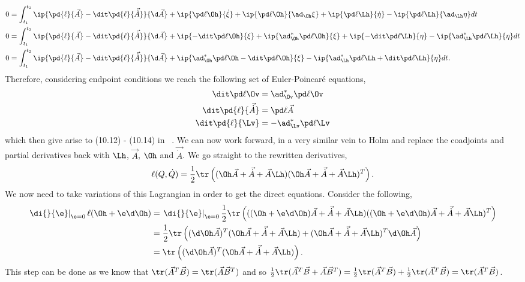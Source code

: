 \begin{align*}
  0 &= \int_{t_1}^{t_2} \ip{\pd{\ell}{\vec A} - \dit\pd{\ell}{\vec{\dot A}}}{\d \vec A} + \ip{\pd \ell \Oh}{\dot \xi} + \ip{\pd \ell \Oh}{\ad_{\Oh} \xi} + \ip{\pd \ell \Lh}{\dot \eta} - \ip{\pd \ell \Lh}{\ad_{\Lh} \eta}dt \\
  0 &= \int_{t_1}^{t_2} \ip{\pd{\ell}{\vec A} - \dit\pd{\ell}{\vec{\dot A}}}{\d \vec A} + \ip{-\dit\pd \ell \Oh}{\xi} + \ip{\ad^*_{\Oh} \pd \ell \Oh}{\xi} + \ip{-\dit \pd \ell \Lh}{\eta} - \ip{\ad^*_{\Lh} \pd \ell \Lh}{ \eta}dt \\
  0 &= \int_{t_1}^{t_2} \ip{\pd{\ell}{\vec A} - \dit\pd{\ell}{\vec{\dot A}}}{\d \vec A} + \ip{\ad^*_{\Oh} \pd \ell \Oh -\dit\pd \ell \Oh}{\xi} - \ip{\ad^*_{\Lh} \pd \ell \Lh + \dit \pd \ell \Lh}{ \eta}dt.
\end{align*}
Therefore, considering endpoint conditions we reach the following set of Euler-Poincar\'e equations,
\begin{align}
  \dit \pd \ell \Ov &= \ad^*_{\Ov} \pd \ell \Ov \\
  \dit \pd{\ell}{\vec{\dot A}} &= \pd \ell {\vec A} \\
  \dit \pd{\ell}{\Lv} &= -\ad^*_{\Lv} \pd \ell \Lv
\end{align}
which then give arise to (10.12) - (10.14) in ~\cite{holm_schmah_stoica_2009}. We can now work forward, in a very similar vein to Holm and replace the coadjoints and partial derivatives back with $\Lh$, $\vec A$, $\Oh$ and $\vec{\dot A}$. We go straight to the rewritten derivatives,
$$ \ell(Q, \dot Q) = \frac{1}{2}\tr \left( (\Oh \vec A + \vec {\dot A} + \vec A\Lh)(\Oh \vec A + \vec {\dot A} + \vec A\Lh)^T \right). $$
We now need to take variations of this Lagrangian in order to get the direct equations. Consider the following,
\begin{align*}
  \left.\di{}{\e}\right|_{\e = 0}\ell (\Oh + \e\d\Oh) &= \left.\di{}{\e}\right|_{\e = 0} \frac{1}{2}\tr\left( ((\Oh + \e\d\Oh) \vec A + \vec {\dot A} + \vec A\Lh)((\Oh + \e\d\Oh) \vec A + \vec {\dot A} + \vec A\Lh)^T \right) \\
  &= \frac{1}{2}\tr\left( (\d\Oh \vec A)^T (\Oh \vec A + \vec {\dot A} + \vec A\Lh) + (\Oh \vec A + \vec {\dot A} + \vec A\Lh)^T \d\Oh \vec A \right)\\
  &= \tr\left( (\d\Oh \vec A)^T (\Oh \vec A + \vec {\dot A} + \vec A\Lh)  \right).
\end{align*}
This step can be done as we know that $\tr(\vec A^T\vec B) = \tr(\vec A\vec B^T)$ and so $\frac{1}{2}\tr(\vec A^T\vec B + \vec A\vec B^T) = \frac{1}{2}\tr(\vec A^T\vec B) + \frac{1}{2}\tr(\vec A^T\vec B) = \tr(\vec A^T\vec B)$.
